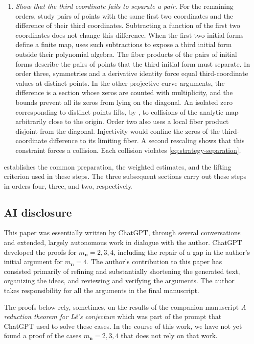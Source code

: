 \documentclass[11pt,letterpaper]{article}
\numberwithin{equation}{section}
\theoremstyle{remark}
\theoremstyle{plain}
\begin{document}
\begin{enumerate}
\item \label{step:third-coordinate}
\emph{Show that the third coordinate fails to separate a pair.}
For the remaining orders, study pairs of points with the same first
two coordinates and the difference of their third coordinates.
Subtracting a function of the first two coordinates does not change
this difference.  When the first two initial forms define a finite
map,  uses such subtractions to expose a
third initial form outside their polynomial algebra.
The fiber products of the pairs of initial forms describe the pairs
of points that the third initial form must separate.  In order three,
symmetries and a derivative identity force equal third-coordinate values at distinct
points.  In the other
projective curve arguments, the difference is a section whose zeros
are counted with multiplicity, and the bounds prevent all its zeros
from lying on the diagonal.  An isolated zero corresponding to
distinct points lifts, by , to collisions
of the analytic map arbitrarily close to the origin.
Order two also uses a local fiber product disjoint from the diagonal.
Injectivity would confine the zeros of the third-coordinate difference
to its limiting fiber.  A second rescaling shows that this constraint
forces a collision.
Each collision violates \eqref{eq:strategy-separation}.
\end{enumerate}

 establishes the common preparation, the weighted
estimates, and the lifting criterion used in these steps.  The three
subsequent sections carry out these steps in orders four, three, and two,
respectively.

\subsection*{AI disclosure}

This paper was essentially written by ChatGPT,
through several conversations and extended, largely autonomous work in
dialogue with the author. ChatGPT developed the proofs for
$m_{\boldsymbol n}=2,3,4$, including the repair of a gap in the author's
initial argument for $m_{\boldsymbol n}=4$. The author's contribution to this 
paper has consisted primarily of
refining and substantially shortening the generated text, organizing
the ideas, and reviewing and verifying the arguments. The author takes
responsibility for all the arguments in the final manuscript.

The proofs below rely, sometimes, on the results of the companion manuscript
\emph{A reduction theorem for L\^e's conjecture}
\cite{PortillaReduction} which was part of the prompt that ChatGPT used to 
solve these cases. In the course of this work, we have not yet
found a proof of the cases $m_{\boldsymbol n}=2,3,4$ that does not rely
on that work.
\end{document}
